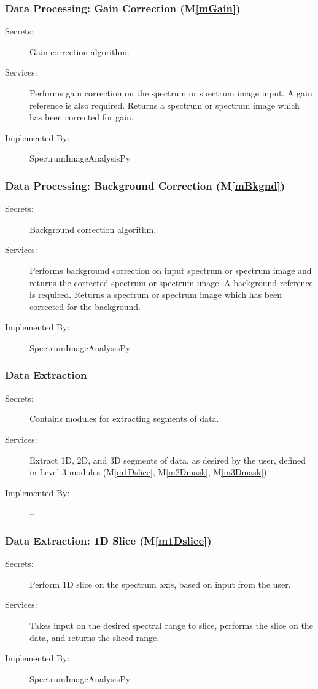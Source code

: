 \documentclass[12pt, titlepage]{article}
\newcommand{\mref}[1]{M\ref{#1}}
\newcommand{\progname}{SpectrumImageAnalysisPy}
\begin{document}
\subsubsection{Data Processing: Gain Correction (\mref{mGain})}
\label{sssec:Gain}
\begin{description}
	\item[Secrets:]Gain correction algorithm.
	\item[Services:]Performs gain correction on the spectrum or spectrum image
input. A gain reference is also required. Returns a spectrum or spectrum image
which has been corrected for gain.
	\item[Implemented By:] \progname
\end{description}

\subsubsection{Data Processing: Background Correction (\mref{mBkgnd})}
\label{sssec:Bkgnd}
\begin{description}
	\item[Secrets:]Background correction algorithm.
	\item[Services:]Performs background correction on input spectrum or spectrum
image and returns the corrected spectrum or spectrum image. A background
reference is required. Returns a spectrum or spectrum image which has been
corrected for the background.
	\item[Implemented By:] \progname
\end{description}

\subsubsection{Data Extraction}
\label{sssec:Extract}
\begin{description}
	\item[Secrets:]Contains modules for extracting segments of data.
	\item[Services:]Extract 1D, 2D, and 3D segments of data, as desired by the
user, defined in Level 3 modules (\mref{m1Dslice}, \mref{m2Dmask},
\mref{m3Dmask}).
	\item[Implemented By:] --
\end{description}

\subsubsection{Data Extraction: 1D Slice (\mref{m1Dslice})}
\label{sssec:Extract1D}
\begin{description}
	\item[Secrets:]Perform 1D slice on the spectrum axis, based on input from the
user.
	\item[Services:]Takes input on the desired spectral range to slice, performs
the slice on the data, and returns the sliced range.
	\item[Implemented By:] \progname
\end{description}
\end{document}
